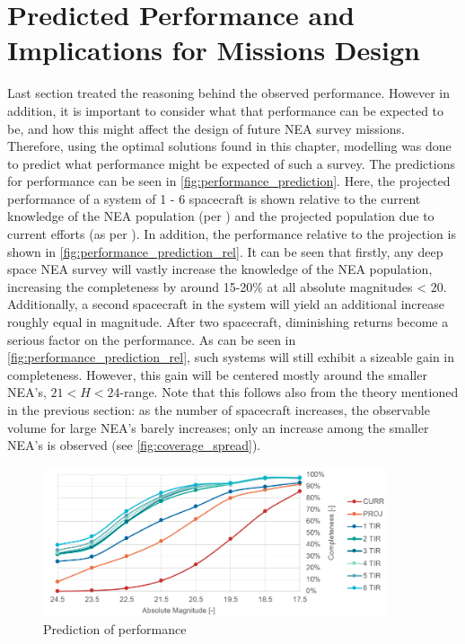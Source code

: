 \section{Predicted Performance and Implications for Missions Design}
\label{sec:results_performance}
Last section treated the reasoning behind the observed performance. However in addition, it is important to consider what that performance can be expected to be, and how this might affect the design of future NEA survey missions. Therefore, using the optimal solutions found in this chapter, modelling was done to predict what performance might be expected of such a survey. The predictions for performance can be seen in \autoref{fig:performance_prediction}. Here, the projected performance of a system of 1 - 6 spacecraft is shown relative to the current knowledge of the NEA population (per \cite{HarrisPopulation}) and the projected population due to current efforts (as per \cite{2017NEOSDT}). In addition, the performance relative to the projection is shown in \autoref{fig:performance_prediction_rel}. It can be seen that firstly, any deep space NEA survey will vastly increase the knowledge of the NEA population, increasing the completeness by around 15-20\% at all absolute magnitudes < 20. Additionally, a second spacecraft in the system will yield an additional increase roughly equal in magnitude. After two spacecraft, diminishing returns become a serious factor on the performance. As can be seen in \autoref{fig:performance_prediction_rel}, such systems will still exhibit a sizeable gain in completeness. However, this gain will be centered mostly around the smaller NEA's, $21 < H < 24$-range. Note that this follows also from the theory mentioned in the previous section: as the number of spacecraft increases, the observable volume for large NEA's barely increases; only an increase among the smaller NEA's is observed (see \autoref{fig:coverage_spread}).\\


\begin{figure}[htbp]
 \centering
 \includegraphics[width=0.9\textwidth]{img/performance_prediction.png}
 \caption{Prediction of performance}
 \label{fig:performance_prediction}
\end{figure}

